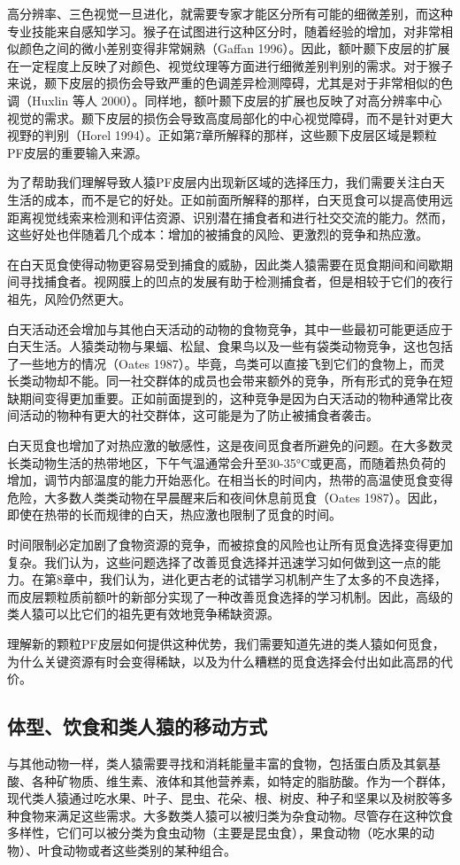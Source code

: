 高分辨率、三色视觉一旦进化，就需要专家才能区分所有可能的细微差别，而这种专业技能来自感知学习。猴子在试图进行这种区分时，随着经验的增加，对非常相似颜色之间的微小差别变得非常娴熟（Gaffan 1996）。因此，额叶颞下皮层的扩展在一定程度上反映了对颜色、视觉纹理等方面进行细微差别判别的需求。对于猴子来说，颞下皮层的损伤会导致严重的色调差异检测障碍，尤其是对于非常相似的色调（Huxlin 等人 2000）。同样地，额叶颞下皮层的扩展也反映了对高分辨率中心视觉的需求。颞下皮层的损伤会导致高度局部化的中心视觉障碍，而不是针对更大视野的判别（Horel 1994）。正如第7章所解释的那样，这些颞下皮层区域是颗粒PF皮层的重要输入来源。

为了帮助我们理解导致人猿PF皮层内出现新区域的选择压力，我们需要关注白天生活的成本，而不是它的好处。正如前面所解释的那样，白天觅食可以提高使用远距离视觉线索来检测和评估资源、识别潜在捕食者和进行社交交流的能力。然而，这些好处也伴随着几个成本：增加的被捕食的风险、更激烈的竞争和热应激。

在白天觅食使得动物更容易受到捕食的威胁，因此类人猿需要在觅食期间和间歇期间寻找捕食者。视网膜上的凹点的发展有助于检测捕食者，但是相较于它们的夜行祖先，风险仍然更大。

白天活动还会增加与其他白天活动的动物的食物竞争，其中一些最初可能更适应于白天生活。人猿类动物与果蝠、松鼠、食果鸟以及一些有袋类动物竞争，这也包括了一些地方的情况（Oates 1987）。毕竟，鸟类可以直接飞到它们的食物上，而灵长类动物却不能。同一社交群体的成员也会带来额外的竞争，所有形式的竞争在短缺期间变得更加重要。正如前面提到的，这种竞争是因为白天活动的物种通常比夜间活动的物种有更大的社交群体，这可能是为了防止被捕食者袭击。

白天觅食也增加了对热应激的敏感性，这是夜间觅食者所避免的问题。在大多数灵长类动物生活的热带地区，下午气温通常会升至30-35°C或更高，而随着热负荷的增加，调节内部温度的能力开始恶化。在相当长的时间内，热带的高温使觅食变得危险，大多数人类类动物在早晨醒来后和夜间休息前觅食（Oates 1987）。因此，即使在热带的长而规律的白天，热应激也限制了觅食的时间。

时间限制必定加剧了食物资源的竞争，而被掠食的风险也让所有觅食选择变得更加复杂。我们认为，这些问题选择了改善觅食选择并迅速学习如何做到这一点的能力。在第8章中，我们认为，进化更古老的试错学习机制产生了太多的不良选择，而皮层颗粒质前额叶的新部分实现了一种改善觅食选择的学习机制。因此，高级的类人猿可以比它们的祖先更有效地竞争稀缺资源。

理解新的颗粒PF皮层如何提供这种优势，我们需要知道先进的类人猿如何觅食，为什么关键资源有时会变得稀缺，以及为什么糟糕的觅食选择会付出如此高昂的代价。

\subsection{体型、饮食和类人猿的移动方式}
与其他动物一样，类人猿需要寻找和消耗能量丰富的食物，包括蛋白质及其氨基酸、各种矿物质、维生素、液体和其他营养素，如特定的脂肪酸。作为一个群体，现代类人猿通过吃水果、叶子、昆虫、花朵、根、树皮、种子和坚果以及树胶等多种食物来满足这些需求。大多数类人猿可以被归类为杂食动物。尽管存在这种饮食多样性，它们可以被分类为食虫动物（主要是昆虫食），果食动物（吃水果的动物）、叶食动物或者这些类别的某种组合。

